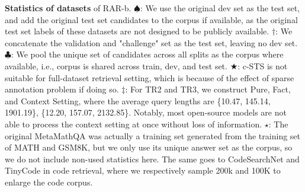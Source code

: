\begin{table}[t!]
    \caption{\textbf{Statistics of datasets} of RAR-b. $\spadesuit$: We use the original dev set as the test set, and add the original test set candidates to the corpus if available, as the original test set labels of these datasets are not designed to be publicly available. $\dagger$: We concatenate the validation and "challenge" set as the test set, leaving no dev set. $\clubsuit$: We pool the unique set of candidates across all splits as the corpus where available, i.e., corpus is shared across train, dev, and test set. $\bigstar$: c-STS is not suitable for full-dataset retrieval setting, which is because of the effect of sparse annotation problem if doing so. $\ddagger$: For TR2 and TR3, we construct Pure, Fact, and Context Setting, where the average query lengths are \{10.47, 145.14, 1901.19\}, \{12.20, 157.07, 2132.85\}. Notably, most open-source models are not able to process the context setting at once without loss of information. $\star$: The original MetaMathQA was actually a training set generated from the training set of MATH and GSM8K, but we only use its unique answer set as the corpus, so we do not include non-used statistics here. The same goes to CodeSearchNet and TinyCode in code retrieval, where we respectively sample 200k and 100K to enlarge the code corpus.}
    \label{tab:dataset_stats}
\end{table}